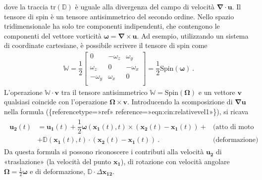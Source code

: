 \documentclass[letterpaper,10pt,italian]{jupyterBook}
\begin{document}
\sphinxAtStartPar
dove la traccia \(\text{tr}(\mathbb{D})\) è uguale alla
divergenza del campo di velocità \(\mathbf{\nabla} \cdot \mathbf{u}\). Il tensore
di spin è un tensore antisimmetrico del secondo ordine. Nello spazio
tridimensionale ha solo tre componenti indipendenti, che contengono le
componenti del vettore vorticità
\(\mathbf{\omega} = \mathbf{\nabla} \times \mathbf{u}\). Ad esempio, utilizzando un
sistema di coordinate cartesiane, è possibile scrivere il tensore di
spin come
\begin{equation*}
\begin{split}\mathbb{W} = \dfrac{1}{2}\begin{bmatrix}
   0 & -\omega_z & \omega_y \\
   \omega_z & 0 & -\omega_x \\
   -\omega_y & \omega_x & 0 \\   
  \end{bmatrix} = \dfrac{1}{2}\text{Spin}(\mathbf{\omega}) \ .\end{split}
\end{equation*}
\sphinxAtStartPar
L’operazione \(\mathbb{W} \cdot \mathbf{v}\) tra il tensore antisimmetrico
\(\mathbb{W}=\text{Spin}(\mathbf{\Omega})\) e un vettore \(\mathbf{v}\) qualsiasi
coincide con l’operazione \(\mathbf{\Omega} \times \mathbf{v}\). Introducendo la
scomposizione di \(\mathbf{\nabla} \mathbf{u}\) nella formula
(\{reference\sphinxhyphen{}type=»ref»
reference=»eqn:cin:relative\sphinxhyphen{}vel\sphinxhyphen{}1»\}), si ricava
\begin{equation*}
\begin{split}\begin{aligned}
 \mathbf{u_2}(t) & = \mathbf{u_1}(t) + \dfrac{1}{2}\mathbf{\omega}(\mathbf{x_1}(t),t) \times (\mathbf{x_2}(t) - \mathbf{x_1}(t) ) +  & \text{(atto di moto rigido)} \\ 
& + \mathbb{D}(\mathbf{x_1}(t),t) \cdot (\mathbf{x_2}(t) - \mathbf{x_1}(t)) \ . & \text{(deformazione)}
\end{aligned}\end{split}
\end{equation*}
\sphinxAtStartPar
Da questa formula si possono riconoscere i contributi
alla velocità \(\mathbf{u_2}\) di «traslazione» (la velocità del punto
\(\mathbf{x_1}\)), di rotazione con velocità angolare
\(\mathbf{\Omega} = \frac{1}{2} \mathbf{\omega}\) e di deformazione,
\(\mathbb{D} \cdot \Delta\mathbf{x_{12}}\).
\end{document}
